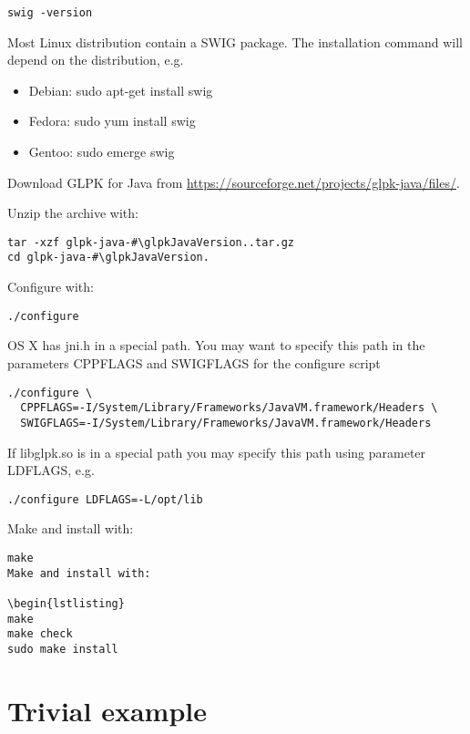 \documentclass[a4paper,11pt]{report}
\newcommand{\glpkJavaVersion}{1.0.33}
\begin{document}
\begin{lstlisting}
swig -version
\end{lstlisting}

Most Linux distribution contain a SWIG package. The installation command will
depend on the distribution, e.g.

\begin{itemize}
\item Debian: sudo apt-get install swig
\item Fedora: sudo yum install swig
\item Gentoo: sudo emerge swig
\end{itemize}

Download GLPK for Java from \href{https://sourceforge.net/projects/glpk-java/files/}{https://sourceforge.net/projects/glpk-java/files/}.

Unzip the archive with:

\begin{lstlisting}
tar -xzf glpk-java-#\glpkJavaVersion..tar.gz
cd glpk-java-#\glpkJavaVersion.
\end{lstlisting}

Configure with:
\begin{lstlisting}
./configure
\end{lstlisting}

OS X has jni.h in a special path. You may want to specify this path in the
parameters CPPFLAGS and SWIGFLAGS for the configure script

\begin{lstlisting}
./configure \
  CPPFLAGS=-I/System/Library/Frameworks/JavaVM.framework/Headers \
  SWIGFLAGS=-I/System/Library/Frameworks/JavaVM.framework/Headers
\end{lstlisting}

If libglpk.so is in a special path you may specify this path using parameter
LDFLAGS, e.g.

\begin{lstlisting}
./configure LDFLAGS=-L/opt/lib
\end{lstlisting}

Make and install with:

\begin{lstlisting}
make
Make and install with:

\begin{lstlisting}
make
make check
sudo make install
\end{lstlisting}

\section{Trivial example}
\end{document}

